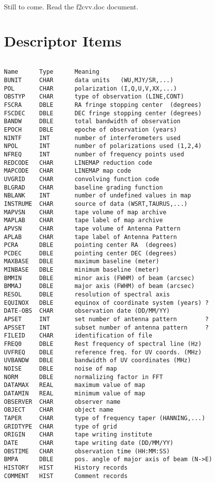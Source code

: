 Still to come. Read the f2cvv.doc document.

\appendix
\chapter{Descriptor Items}

\begin{verbatim}

Name      Type      Meaning
BUNIT     CHAR      data units   (WU,MJY/SR,...)
POL       CHAR      polarization (I,Q,U,V,XX,...)
OBSTYP    CHAR      type of observation (LINE,CONT)
FSCRA     DBLE      RA fringe stopping center  (degrees)
FSCDEC    DBLE      DEC fringe stopping center (degrees)
BANDW     DBLE      total bandwidth of observation
EPOCH     DBLE      epoche of observation (years)
NINTF     INT       number of interferometers used
NPOL      INT       number of polarizations used (1,2,4)
NFREQ     INT       number of frequency points used
REDCODE   CHAR      LINEMAP reduction code
MAPCODE   CHAR      LINEMAP map code
UVGRID    CHAR      convolving function code
BLGRAD    CHAR      baseline grading function
NBLANK    INT       number of undefined values in map
INSTRUME  CHAR      source of data (WSRT,TAURUS,...)
MAPVSN    CHAR      tape volume of map archive
MAPLAB    CHAR      tape label of map archive
APVSN     CHAR      tape volume of Antenna Pattern
APLAB     CHAR      tape label of Antenna Pattern
PCRA      DBLE      pointing center RA  (degrees)
PCDEC     DBLE      pointing center DEC (degrees)
MAXBASE   DBLE      maximum baseline (meter)
MINBASE   DBLE      minimum baseline (meter)
BMMIN     DBLE      minor axis (FWHM) of beam (arcsec)
BMMAJ     DBLE      major axis (FWHM) of beam (arcsec)
RESOL     DBLE      resolution of spectral axis
EQUINOX   DBLE      equinox of coordinate system (years) ?
DATE-OBS  CHAR      observation date (DD/MM/YY)
APSET     INT       set number of antenna pattern        ?
APSSET    INT       subset number of antenna pattern     ?
FILEID    CHAR      identification of file
FREQ0     DBLE      Rest frequency of spectral line (Hz)
UVFREQ    DBLE      reference freq. for UV coords. (MHz)
UVBANDW   DBLE      bandwidth of UV coordinates (MHz)
NOISE     DBLE      noise of map
NORM      DBLE      normalizing factor in FFT
DATAMAX   REAL      maximum value of map
DATAMIN   REAL      minimum value of map
OBSERVER  CHAR      observer name
OBJECT    CHAR      object name
TAPER     CHAR      type of frequency taper (HANNING,...)
GRIDTYPE  CHAR      type of grid
ORIGIN    CHAR      tape writing institute
DATE      CHAR      tape writing date (DD/MM/YY)
OBSTIME   CHAR      observation time (HH:MM:SS)
BMPA      DBLE      pos. angle of major axis of beam (N->E)
HISTORY   HIST      History records
COMMENT   HIST      Comment records
\end{verbatim}

